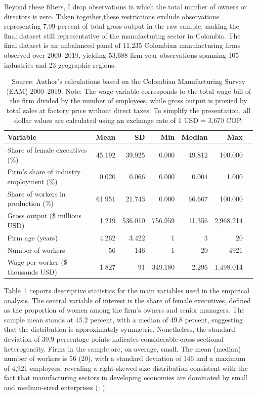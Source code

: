 \documentclass[12pt]{article}
\begin{document}
Beyond these filters, I drop observations in which the total number of owners or directors is zero. Taken together,these restrictions exclude observations representing 7.99 percent of total gross output in the raw sample, making the final dataset still representative of the manufacturing sector in Colombia. The final dataset is an unbalanced panel of 11,235 Colombian manufacturing firms observed over 2000--2019, yielding 53,688 firm-year observations spanning 105 industries and 23 geographic regions.

\begin{table}[htbp]
\centering
\footnotesize
\caption{Descriptive Statistics}
\label{tab:desc_stats}
\begin{tabular}{lrrrrrr}
\hline\hline
Variable & Mean & SD & Min & Median & Max \\
\hline
Share of female executives (\%) & 45.192 & 39.925 & 0.000 & 49.812 & 100.000 \\
Firm's share of industry employment (\%) & 0.020 & 0.066 & 0.000 & 0.004 & 1.000 \\
Share of workers in production (\%) & 61.951 & 21.743 & 0.000 & 66.667 & 100.000 \\
Gross output (\$ millions USD) & 1.219 & 536.010 & 756.959 & 11.356 & 2,968.214 \\
Firm age (years) & 4.262 & 3.422 & 1 & 3 & 20 \\
Number of workers & 56 & 146 & 1 & 20 & 4921 \\
Wage per worker (\$ thousands USD) & 1.827 & 91 & 349.180 & 2.296 & 1,498.014 \\
\hline\hline
\end{tabular}
\caption*{\footnotesize Source: Author's calculations based on the Colombian Manufacturing Survey (EAM) 2000--2019. 
Note: The wage variable corresponds to the total wage bill of the firm divided by the number of employees, while gross output is proxied by total sales at factory price without direct taxes. To simplify the presentation, all dollar values are calculated using an exchange rate of 1 USD = 3,670 COP.}
\end{table}

Table~\ref{tab:desc_stats} reports descriptive statistics for the main variables used in the empirical analysis. The central variable of interest is the share of female executives, defined as the proportion of women among the firm's owners and senior managers. The sample mean stands at 45.2 percent, with a median of 49.8 percent, suggesting that the distribution is approximately symmetric. Nonetheless, the standard deviation of 39.9 percentage points indicates considerable cross-sectional heterogeneity. Firms in the sample are, on average, small. The mean (median) number of workers is 56 (20), with a standard deviation of 146 and a maximum of 4,921 employees, revealing a right-skewed size distribution consistent with the fact that manufacturing sectors in developing economies are dominated by small and medium-sized enterprises (\textcite{alviarez_markets_2025}; \textcite{eslava_job_2022}).  
\end{document}
